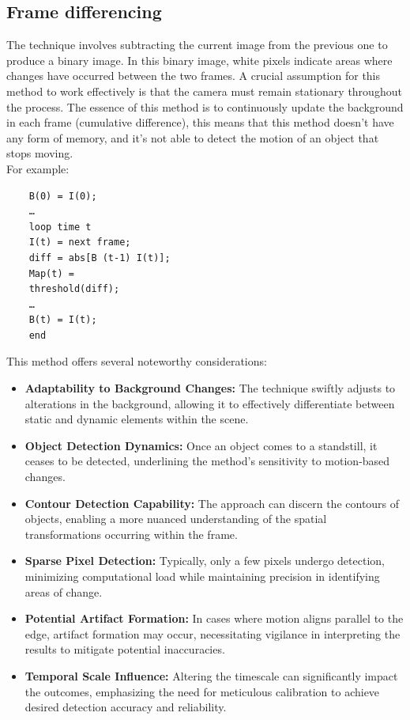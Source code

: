 \subsection{Frame differencing}
The technique involves subtracting the current image from the previous one to produce a binary image. 
In this binary image, white pixels indicate areas where changes have occurred between the two frames. 
A crucial assumption for this method to work effectively is that the camera must remain stationary throughout the process. 
The essence of this method is to continuously update the background in each frame (cumulative difference), this means that this method doesn't have any form of memory, and it's not able to detect the motion of an object that stops moving.
\\For example:
\begin{verbatim}
    B(0) = I(0);
    …
    loop time t
    I(t) = next frame;
    diff = abs[B (t-1) I(t)];
    Map(t) =
    threshold(diff);
    …
    B(t) = I(t);
    end
\end{verbatim} 
This method offers several noteworthy considerations:
\begin{itemize}
    \item \textbf{Adaptability to Background Changes:} The technique swiftly adjusts to alterations in the background, allowing it to effectively differentiate between static and dynamic elements within the scene.
    \item \textbf{Object Detection Dynamics:} Once an object comes to a standstill, it ceases to be detected, underlining the method's sensitivity to motion-based changes.
    \item \textbf{Contour Detection Capability:} The approach can discern the contours of objects, enabling a more nuanced understanding of the spatial transformations occurring within the frame.
    \item \textbf{Sparse Pixel Detection:} Typically, only a few pixels undergo detection, minimizing computational load while maintaining precision in identifying areas of change.
    \item \textbf{Potential Artifact Formation:} In cases where motion aligns parallel to the edge, artifact formation may occur, necessitating vigilance in interpreting the results to mitigate potential inaccuracies.
    \item \textbf{Temporal Scale Influence:} Altering the timescale can significantly impact the outcomes, emphasizing the need for meticulous calibration to achieve desired detection accuracy and reliability.
\end{itemize}

